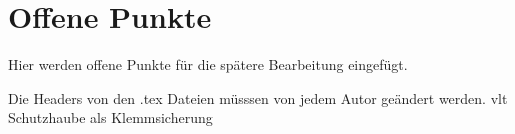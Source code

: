 %
%
%

\chapter{Offene Punkte}
 Hier werden offene Punkte für die spätere Bearbeitung eingefügt. 

 Die Headers von den .tex Dateien müsssen von jedem Autor geändert werden.
 vlt Schutzhaube als Klemmsicherung




